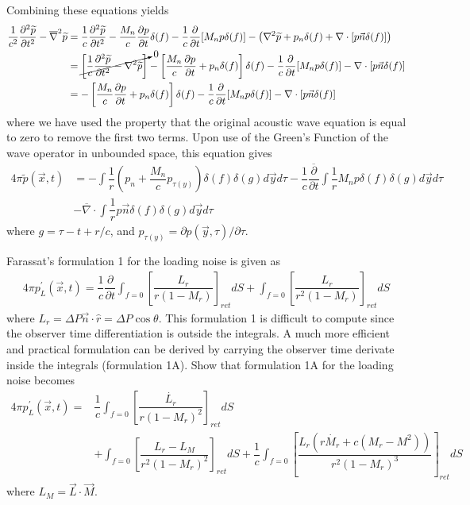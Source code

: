 \documentclass[onecolumn,10pt]{jhwhw}
\begin{document}
Combining these equations yields
\begin{align*}
\dfrac{1}{c^2} \dfrac{\partial^2 \widetilde{p}}{\partial t^2}
- \overline{\nabla}^2 \widetilde{p}
&=
\dfrac{1}{c} \dfrac{\partial^2 \widetilde{p}}{\partial t^2}
- \dfrac{M_n}{c} \dfrac{\partial p}{\partial t} \delta (f)
-\dfrac{1}{c} \dfrac{\partial}{\partial t} [M_n p \delta (f)]
- \left( \nabla^2 \widetilde{p} + p_n \delta (f)
+ \nabla \cdot [p \vec{n} \delta (f)] \right) \\
&=
\cancelto{0}{
\left [\dfrac{1}{c} \dfrac{\partial^2 \widetilde{p}}{\partial t^2}  - \nabla^2 \widetilde{p} \right]}
- \left[ \dfrac{M_n}{c} \dfrac{\partial p}{\partial t} + p_n \delta (f)\right] \delta (f)
-\dfrac{1}{c} \dfrac{\partial}{\partial t} [M_n p \delta (f)]
- \nabla \cdot [p \vec{n} \delta (f)] \\
&=
- \left[ \dfrac{M_n}{c} \dfrac{\partial p}{\partial t} + p_n \delta (f)\right] \delta (f)
-\dfrac{1}{c} \dfrac{\partial}{\partial t} [M_n p \delta (f)]
- \nabla \cdot [p \vec{n} \delta (f)]
\end{align*}
where we have used the property that the original acoustic wave equation is equal to zero to remove the first two terms. Upon use of the Green's Function of the wave operator in unbounded space, this equation gives
\begin{align*}
4 \pi \widetilde{p}(\vec{x}, t) &=
- \int \dfrac{1}{r} \left( p_n + \dfrac{M_n}{c} p_{\tau(y)} \right) \delta (f) \delta(g) d \vec{y} d \tau
- \dfrac{1}{c} \dfrac{\overline{\partial}}{\partial t} \int \dfrac{1}{r} M_n p \delta (f) \delta(g) d \vec{y} d \tau \\
&- \overline{\nabla} \cdot \int \dfrac{1}{r} p \vec{n} \delta (f) \delta (g) d \vec{y} d \tau
\end{align*}
where $g=\tau - t + r/c$, and $p_{\tau (y)} = \partial p (\vec{y}, \tau) / \partial \tau$.

\problem{[50 points]}
Farassat’s formulation 1 for the loading noise is given as
\begin{align} \label{loading_noise}
4 \pi p_L^{\prime}(\vec{x}, t) = \dfrac{1}{c} \dfrac{\partial}{\partial t}
\int_{f=0} \left[ \dfrac{L_r}{r(1-M_r)} \right]_{ret} dS + \int_{f=0} \left[ \dfrac{L_r}{r^2(1-M_r)} \right]_{ret} dS
\end{align}
where $L_r = \Delta P \vec{n} \cdot \hat{r} = \Delta P \cos \theta$. This formulation 1 is difficult to compute since the observer time differentiation is outside the integrals. A much more efficient and practical formulation can be derived by carrying the observer time derivate inside the integrals (formulation 1A). Show that formulation 1A for the loading noise becomes
\begin{align*}
4 \pi p_L^{\prime}(\vec{x}, t) =& \dfrac{1}{c} \int_{f=0} \left[ \dfrac{\dot{L_r}}{r(1-M_r)^2} \right]_{ret} dS \\
&+ \int_{f=0} \left[ \dfrac{L_r-L_M}{r^2(1-M_r)^2} \right]_{ret} dS
+ \dfrac{1}{c} \int_{f=0} \left[ \dfrac{L_r (r \dot{M_r} + c(M_r-M^2))}{r^2(1-M_r)^3} \right]_{ret} dS
\end{align*}
where $L_M = \vec{L} \cdot \vec{M}$.
\end{document}
